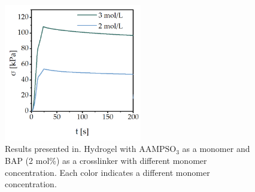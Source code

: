 \begin{figure}[ht!]
    \centering
    \includegraphics[width=6cm]{figs/mechResponse/2-c.png}
    \caption{
        Results presented in\citep{romischkeSwellingMechanicalCharacterization2022}. 
        Hydrogel with $\mathrm{AAMPSO}_3$ as a monomer and BAP (2 mol\%) as a crosslinker with different monomer concentration.
    Each color indicates a different monomer concentration. 
}\label{fig:mechResponseEnd1}
\end{figure}



